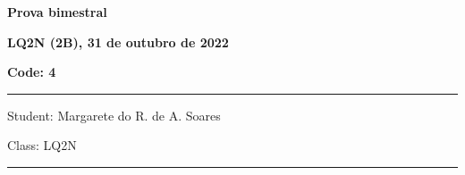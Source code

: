 \documentclass[12pt, addpoints]{exam}
\begin{document}
    \begin{minipage}[b]{0.75\linewidth}
        \begin{flushleft}
            {\bf \large Prova bimestral}
        \end{flushleft}
        \begin{flushleft}
            {\bf \large LQ2N (2B), 31 de outubro de 2022}
        \end{flushleft}
    \end{minipage}
    \begin{minipage}[b]{0.20\linewidth}
        \begin{flushright}
            {\bf \large Code: 4}
        \end{flushright}
    \end{minipage}
    \vspace{0.5cm} \hrule \vspace{0.5cm}
    \begin{minipage}{0.75\linewidth}
        \begin{flushleft}
            Student: Margarete do R. de A. Soares
        \end{flushleft}
    \end{minipage}
    \begin{minipage}{0.20\linewidth}
        \begin{flushright}
            Class: LQ2N
        \end{flushright}
    \end{minipage}
    \vspace{0.5cm} \hrule \vspace{0.5cm}
\end{document}
